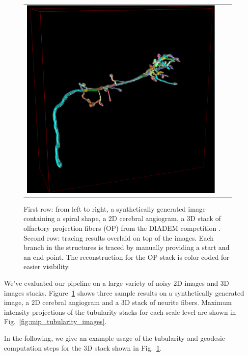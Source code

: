 \documentclass{InsightArticle}
\begin{document}
\begin{figure}[t]
\begin{tabular}{ccc}
    \includegraphics[width=0.31\columnwidth]{OP_1_reconst_3D.png}  \\
  \end{tabular}
  \caption{  \label{fig:results} First row: from left to right, a synthetically generated image containing a 
  spiral shape, a 2D cerebral angiogram, a 3D stack of olfactory projection fibers  (OP) from the DIADEM  
  competition \cite{Diadem10}. Second row: tracing results overlaid on top of the images. Each branch in the 
  structures is traced by manually providing a start and an end point. The reconstruction for the OP stack is 
  color coded for easier visibility.}
  \vspace{-0.3cm}
\end{figure}

We've evaluated our pipeline on a large variety of noisy 2D images and 3D images stacks. 
Figure~\ref{fig:results} shows three sample results on a synthetically generated image, a 2D cerebral 
angiogram and a 3D stack of neurite fibers. Maximum intensity projections of the tubularity stacks for 
each scale level are shown in Fig.~\ref{fig:mip_tubularity_images}. 

In the following, we give an example usage of the tubularity and geodesic computation steps for the 3D 
stack shown in Fig.~\ref{fig:results}.
\end{document}
